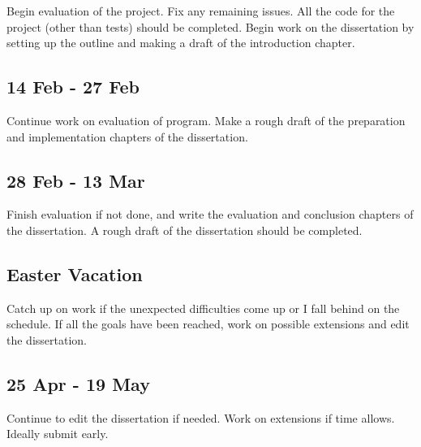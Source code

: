 \documentclass[12pt,a4paper,twoside]{article}
\begin{document}
Begin evaluation of the project. Fix any remaining issues. All the code for the project (other than tests) should be completed. Begin work on the dissertation by setting up the outline and making a draft of the introduction chapter. 

\subsection*{14 Feb - 27 Feb}

Continue work on evaluation of program. Make a rough draft of the preparation and implementation chapters of the dissertation. 

\subsection*{28 Feb - 13 Mar}

Finish evaluation if not done, and write the evaluation and conclusion chapters of the dissertation. A rough draft of the dissertation should be completed. 

\subsection*{Easter Vacation}

Catch up on work if the unexpected difficulties come up or I fall behind on the schedule. If all the goals have been reached, work on possible extensions and edit the dissertation.

\subsection*{25 Apr - 19 May}

Continue to edit the dissertation if needed. Work on extensions if time allows. Ideally submit early. 



\end{document}
